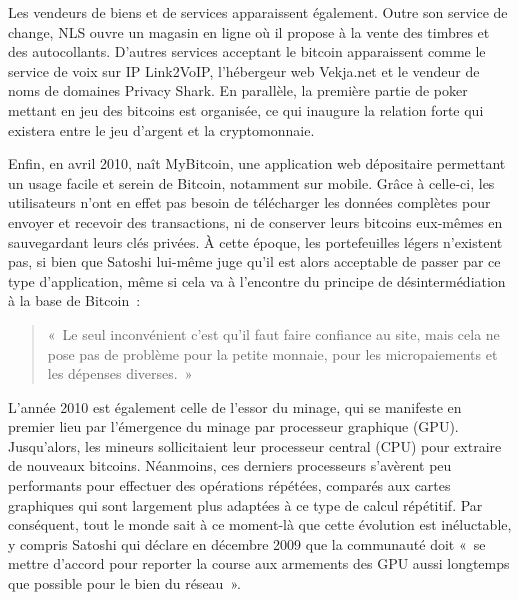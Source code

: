 Les vendeurs de biens et de services apparaissent également. Outre son service de change, NLS ouvre un magasin en ligne où il propose à la vente des timbres et des autocollants. D'autres services acceptant le bitcoin apparaissent comme le service de voix sur IP Link2VoIP, l'hébergeur web Vekja.net et le vendeur de noms de domaines Privacy Shark. En parallèle, la première partie de poker mettant en jeu des bitcoins est organisée, ce qui inaugure la relation forte qui existera entre le jeu d'argent et la cryptomonnaie.

\clearpage
Enfin, en avril 2010, naît MyBitcoin, une application web dépositaire permettant un usage facile et serein de Bitcoin, notamment sur mobile. Grâce à celle-ci, les utilisateurs n'ont en effet pas besoin de télécharger les données complètes pour envoyer et recevoir des transactions, ni de conserver leurs bitcoins eux-mêmes en sauvegardant leurs clés privées. À cette époque, les portefeuilles légers n'existent pas, si bien que Satoshi lui-même juge qu'il est alors acceptable de passer par ce type d'application, même si cela va à l'encontre du principe de désintermédiation à la base de Bitcoin~:

\begin{quote}
«~Le seul inconvénient c'est qu'il faut faire confiance au site, mais cela ne pose pas de problème pour la petite monnaie, pour les micropaiements et les dépenses diverses.~»
\end{quote}


L'année 2010 est également celle de l'essor du minage, qui se manifeste en premier lieu par l'émergence du minage par processeur graphique (GPU). Jusqu'alors, les mineurs sollicitaient leur processeur central (CPU) pour extraire de nouveaux bitcoins. Néanmoins, ces derniers processeurs s'avèrent peu performants pour effectuer des opérations répétées, comparés aux cartes graphiques qui sont largement plus adaptées à ce type de calcul répétitif. Par conséquent, tout le monde sait à ce moment-là que cette évolution est inéluctable, y compris Satoshi qui déclare en décembre 2009 que la communauté doit «~se mettre d'accord pour reporter la course aux armements des GPU aussi longtemps que possible pour le bien du réseau~».

